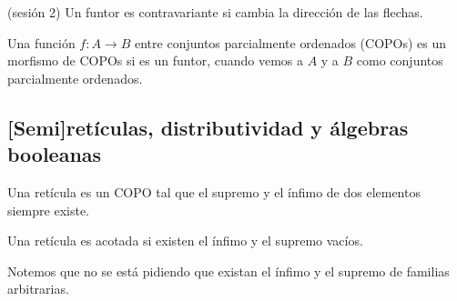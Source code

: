 \documentclass[12pt,letterpaper,titlepage]{article}
\theoremstyle{definition}
\newcommand\<{\langle}
\renewcommand\>{\rangle}
\begin{document}
(sesión 2)
Un funtor es contravariante si cambia la dirección de las
flechas.

Una función $f:A\to B$ entre conjuntos parcialmente ordenados
(COPOs) es un morfismo de COPOs si es un funtor, cuando vemos a
$A$ y a $B$ como conjuntos parcialmente ordenados.

\subsection{[Semi]retículas, distributividad y álgebras booleanas}

Una retícula es un COPO tal que el supremo y el ínfimo de dos
elementos siempre existe.

Una retícula es acotada si existen el ínfimo y el supremo vacíos.

Notemos que no se está pidiendo que existan el ínfimo y el supremo de
familias arbitrarias.
\end{document}
